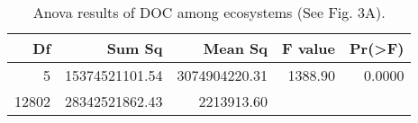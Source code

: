 \begin{table}[ht]
\centering
\begin{tabular}{rrrrr}
  \hline
Df & Sum Sq & Mean Sq & F value & Pr(>F) \\ 
  \hline
5 & 15374521101.54 & 3074904220.31 & 1388.90 & 0.0000 \\ 
  12802 & 28342521862.43 & 2213913.60 &  &  \\ 
   \hline
\end{tabular}
\caption{Anova results of DOC among ecosystems (See Fig. 3A).} 
\end{table}
